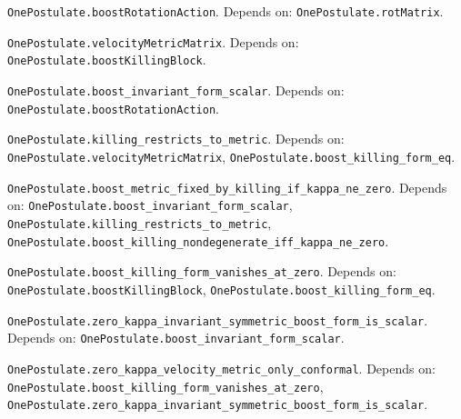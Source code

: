 \begin{definition}\label{OnePostulate.boostRotationAction}
\texttt{OnePostulate.boostRotationAction}. Depends on: \texttt{OnePostulate.rotMatrix}.
\end{definition}

\begin{definition}\label{OnePostulate.velocityMetricMatrix}
\texttt{OnePostulate.velocityMetricMatrix}. Depends on: \texttt{OnePostulate.boostKillingBlock}.
\end{definition}

\begin{lemma}\label{OnePostulate.boost_invariant_form_scalar}
\texttt{OnePostulate.boost\_invariant\_form\_scalar}. Depends on: \texttt{OnePostulate.boostRotationAction}.
\end{lemma}

\begin{lemma}\label{OnePostulate.killing_restricts_to_metric}
\texttt{OnePostulate.killing\_restricts\_to\_metric}. Depends on: \texttt{OnePostulate.velocityMetricMatrix}, \texttt{OnePostulate.boost\_killing\_form\_eq}.
\end{lemma}

\begin{lemma}\label{OnePostulate.boost_metric_fixed_by_killing_if_kappa_ne_zero}
\texttt{OnePostulate.boost\_metric\_fixed\_by\_killing\_if\_kappa\_ne\_zero}. Depends on: \texttt{OnePostulate.boost\_invariant\_form\_scalar}, \texttt{OnePostulate.killing\_restricts\_to\_metric}, \texttt{OnePostulate.boost\_killing\_nondegenerate\_iff\_kappa\_ne\_zero}.
\end{lemma}

\begin{lemma}\label{OnePostulate.boost_killing_form_vanishes_at_zero}
\texttt{OnePostulate.boost\_killing\_form\_vanishes\_at\_zero}. Depends on: \texttt{OnePostulate.boostKillingBlock}, \texttt{OnePostulate.boost\_killing\_form\_eq}.
\end{lemma}

\begin{lemma}\label{OnePostulate.zero_kappa_invariant_symmetric_boost_form_is_scalar}
\texttt{OnePostulate.zero\_kappa\_invariant\_symmetric\_boost\_form\_is\_scalar}. Depends on: \texttt{OnePostulate.boost\_invariant\_form\_scalar}.
\end{lemma}

\begin{lemma}\label{OnePostulate.zero_kappa_velocity_metric_only_conformal}
\texttt{OnePostulate.zero\_kappa\_velocity\_metric\_only\_conformal}. Depends on: \texttt{OnePostulate.boost\_killing\_form\_vanishes\_at\_zero}, \texttt{OnePostulate.zero\_kappa\_invariant\_symmetric\_boost\_form\_is\_scalar}.
\end{lemma}

